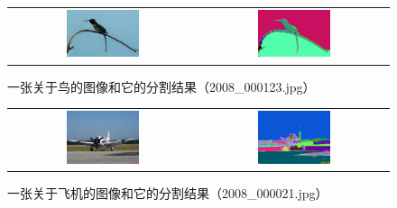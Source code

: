 \documentclass[a4paper, 12pt, UTF8]{article}
\begin{document}
\begin{figure}[h!]
    \centering
    \begin{tabular}{cc}
        \includegraphics[width=0.4\textwidth]{src/images/2008_000123.jpg} &
        \includegraphics[width=0.4\textwidth]{src/images/2008_000123_output.jpg}
    \end{tabular}
    \caption{一张关于鸟的图像和它的分割结果（2008\_000123.jpg）}
    \label{figure_bird}
\end{figure}

\begin{figure}[h!]
    \centering
    \begin{tabular}{cc}
        \includegraphics[width=0.4\textwidth]{src/images/2008_000021.jpg} &
        \includegraphics[width=0.4\textwidth]{src/images/2008_000021_output.jpg}
    \end{tabular}
    \caption{一张关于飞机的图像和它的分割结果（2008\_000021.jpg）}
    \label{figure_aeroplane}
\end{figure}
\end{document}

